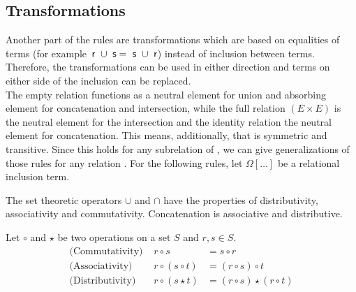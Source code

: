 \documentclass[a4paper,twoside,12pt, english]{article}
\begin{document}
\subsection{Transformations}\label{sec:transformations}
Another part of the rules are transformations which are based on equalities of terms (for example~$\textsf{\upshape r}~\cup~\textsf{\upshape s}=~\textsf{\upshape s}~\cup~\textsf{\upshape r}$) instead of inclusion between terms. Therefore, the transformations can be used in either direction and terms on either side of the inclusion can be replaced. \\
The empty relation \0{} functions as a neutral element for union and absorbing element for concatenation and intersection, while the full relation $(E \times E)$ is the neutral element for the intersection and the identity relation \id{} the neutral element for concatenation. This means, additionally, that \id{} is symmetric and transitive. Since this holds for any subrelation of \id{}, we can give generalizations of those rules for any relation \relr. For the following rules, let $\Omega[\dots]$ be a relational inclusion term.

\noindent The set theoretic operators $\cup$ and $\cap$ have the properties of distributivity, associativity and commutativity. Concatenation is associative and distributive.
\begin{definition}
Let $\circ$ and $\star$ be two operations on a set $S$ and $r,s \in S$.
\begin{eqnarray*}
\text{(Commutativity) }& r \circ s &= s \circ r \\
\text{(Associativity) }& r \circ (s \circ t) &= (r \circ s) \circ t \\
\text{(Distributivity) }& r \circ (s \star t) &= (r \circ s) \star (r \circ t)
\end{eqnarray*}
\end{definition}
\end{document}
